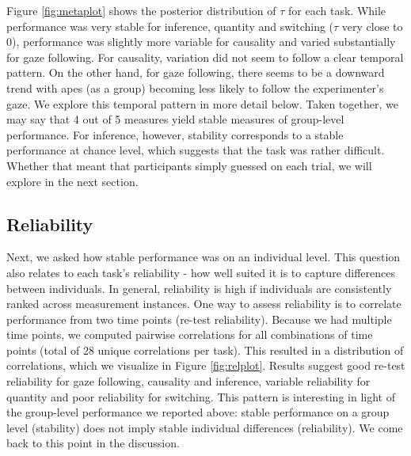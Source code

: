 \documentclass[10pt, letterpaper]{article}
\begin{document}
Figure \ref{fig:metaplot} shows the posterior distribution of \(\tau\)
for each task. While performance was very stable for inference, quantity
and switching (\(\tau\) very close to 0), performance was slightly more
variable for causality and varied substantially for gaze following. For
causality, variation did not seem to follow a clear temporal pattern. On
the other hand, for gaze following, there seems to be a downward trend
with apes (as a group) becoming less likely to follow the experimenter's
gaze. We explore this temporal pattern in more detail below. Taken
together, we may say that 4 out of 5 measures yield stable measures of
group-level performance. For inference, however, stability corresponds
to a stable performance at chance level, which suggests that the task
was rather difficult. Whether that meant that participants simply
guessed on each trial, we will explore in the next section.

\hypertarget{reliability}{%
\subsection{Reliability}\label{reliability}}

Next, we asked how stable performance was on an individual level. This
question also relates to each task's reliability - how well suited it is
to capture differences between individuals. In general, reliability is
high if individuals are consistently ranked across measurement
instances. One way to assess reliability is to correlate performance
from two time points (re-test reliability). Because we had multiple time
points, we computed pairwise correlations for all combinations of time
points (total of 28 unique correlations per task). This resulted in a
distribution of correlations, which we visualize in Figure
\ref{fig:relplot}. Results suggest good re-test reliability for gaze
following, causality and inference, variable reliability for quantity
and poor reliability for switching. This pattern is interesting in light
of the group-level performance we reported above: stable performance on
a group level (stability) does not imply stable individual differences
(reliability). We come back to this point in the discussion.
\end{document}
